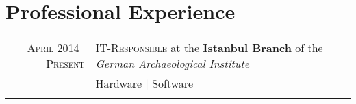 \section{Professional  Experience}

 \begin{tabular}{rl}	
\textsc{April 2014-- Present}  & \textsc{IT-Responsible} at the \textbf{Istanbul Branch}  of the \emph{German Archaeological Institute} \\
& \small{Hardware | Software }\\ 
&\\
\end{tabular}
